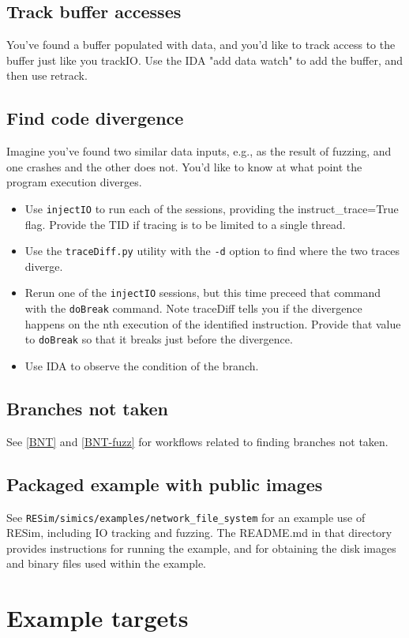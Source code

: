 \documentclass[titlepage]{article}
\begin{document}
\subsection{Track buffer accesses}
You've found a buffer populated with data, and you'd like to track access to the buffer just
like you trackIO.  Use the IDA "add data watch" to add the buffer, and then use retrack.

\subsection{Find code divergence}
Imagine you've found two similar data inputs, e.g., as the result of fuzzing, and one
crashes and the other does not.  You'd like to know at what point the program execution diverges.
\begin{itemize}
\item Use {\tt injectIO} to run each of the sessions, providing the instruct\_trace=True flag.  Provide the TID if
tracing is to be limited to a single thread.
\item Use the {\tt traceDiff.py} utility with the {\tt -d} option to find where the two traces diverge.
\item Rerun one of the {\tt injectIO} sessions, but this time preceed that command with the {\tt doBreak} command.
Note traceDiff tells you if the divergence happens on the nth execution of the identified instruction.  Provide that
value to {\tt doBreak} so that it breaks just before the divergence.
\item Use IDA to observe the condition of the branch.
\end{itemize}

\subsection{Branches not taken}
See \ref{BNT} and \ref{BNT-fuzz} for workflows related to finding branches not taken.

\subsection{Packaged example with public images}
See {\tt RESim/simics/examples/network\_file\_system} for an example use of RESim, including IO tracking and fuzzing.
The README.md in that directory provides instructions for running the example, and for obtaining the disk images
and binary files used within the example.

\section{Example targets}
\label{example-targets}
\end{document}
